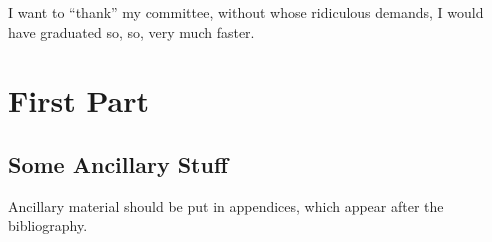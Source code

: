 \documentclass[11pt]{ucthesis}
\begin{document}
\begin{frontmatter}
\begin{acknowledgements}
I want to ``thank'' my committee, without whose ridiculous demands, I
would have graduated so, so, very much faster.
\end{acknowledgements}

\end{frontmatter}

\part{First Part}














\nocite{*}



\appendix
\chapter{Some Ancillary Stuff}

Ancillary material should be put in appendices, which appear after the
bibliography. 
\end{document}
